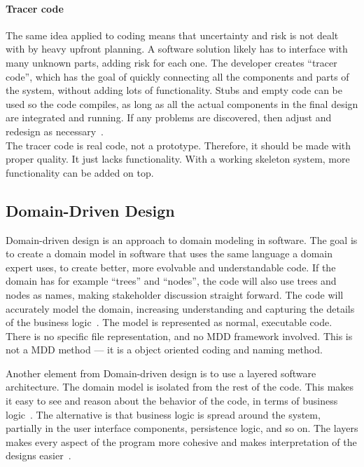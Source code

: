 \paragraph{Tracer code}
The same idea applied to coding means that uncertainty and risk is not dealt with by heavy upfront planning.
A software solution likely has to interface with many unknown parts, adding risk for each one.
The developer creates ``tracer code'', which has the goal of quickly connecting all the components and parts of the system, without adding lots of functionality.
Stubs and empty code can be used so the code compiles, as long as all the actual components in the final design are integrated and running.
If any problems are discovered, then adjust and redesign as necessary~\cite{huntPragmaticProgrammerJourneyman2000}.\\

The tracer code is real code, not a prototype.
Therefore, it should be made with proper quality.
It just lacks functionality.
With a working skeleton system, more functionality can be added on top.


\subsection{Domain-Driven Design}\label{sec:ddd}

Domain-driven design is an approach to domain modeling in software.
The goal is to create a domain model in software that uses the same language a domain expert uses, to create better, more evolvable and understandable code.
If the domain has for example ``trees'' and ``nodes'', the code will also use trees and nodes as names, making stakeholder discussion straight forward.
The code will accurately model the domain, increasing understanding and capturing the details of the business logic~\cite{evansDomaindrivenDesignTackling2004}.
The model is represented as normal, executable code.
There is no specific file representation, and no \acrshort{MDD} framework involved.
This is not a \acrshort{MDD} method --- it is a object oriented coding and naming method.\

Another element from Domain-driven design is to use a layered software architecture.
The domain model is isolated from the rest of the code.
This makes it easy to see and reason about the behavior of the code, in terms of business logic~\cite[p.~69]{evansDomaindrivenDesignTackling2004}.
The alternative is that business logic is spread around the system, partially in the user interface components, persistence logic, and so on.
The layers makes every aspect of the program more cohesive and makes interpretation of the designs easier~\cite[p.~69]{evansDomaindrivenDesignTackling2004}.\\

